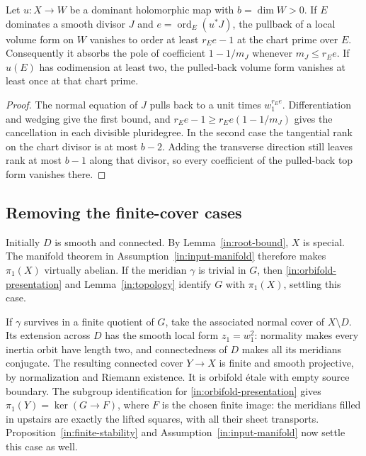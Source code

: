\begin{lemma}\label{in:weighted-vanishing}
Let \(u:X\to W\) be a dominant holomorphic map with
\(b=\dim W>0\).  If \(E\) dominates a smooth divisor \(J\) and
\(e=\operatorname{ord}_E(u^*J)\), the pullback of a local volume
form on \(W\) vanishes to order at least \(r_Ee-1\) at the chart
prime over \(E\).  Consequently it absorbs the pole of coefficient
\(1-1/m_J\) whenever \(m_J\le r_Ee\).  If \(u(E)\) has
codimension at least two, the pulled-back volume form vanishes at
least once at that chart prime.
\end{lemma}

\begin{proof}
The normal equation of \(J\) pulls back to a unit times
\(w_1^{r_Ee}\).  Differentiation and wedging give the first bound,
and
\(r_Ee-1\ge r_Ee(1-1/m_J)\) gives the cancellation in each
divisible pluridegree.  In the second case the tangential rank on
the chart divisor is at most \(b-2\).  Adding the transverse
direction still leaves rank at most \(b-1\) along that divisor,
so every coefficient of the pulled-back top form vanishes there.
\end{proof}

\subsection{Removing the finite-cover cases}
\label{in:finite-cover-cases}
Initially \(D\) is smooth and connected.  By
Lemma~\ref{in:root-bound}, \(X\) is special.  The manifold theorem
in Assumption~\ref{in:input-manifold} therefore makes
\(\pi_1(X)\) virtually abelian.  If the meridian \(\gamma\) is
trivial in \(G\), then \eqref{in:orbifold-presentation} and
Lemma~\ref{in:topology} identify \(G\) with \(\pi_1(X)\), settling
this case.

If \(\gamma\) survives in a finite quotient of \(G\), take the
associated normal cover of \(X\setminus D\).  Its extension across
\(D\) has the smooth local form \(z_1=w_1^2\): normality makes
every inertia orbit have length two, and connectedness of \(D\)
makes all its meridians conjugate.  The resulting connected cover
\(Y\to X\) is finite and smooth projective, by normalization and
Riemann existence.  It is orbifold \'{e}tale with empty source
boundary.  The subgroup identification for
\eqref{in:orbifold-presentation} gives
\(\pi_1(Y)=\ker(G\to F)\), where \(F\) is the chosen finite image:
the meridians filled in upstairs are exactly the lifted squares,
with all their sheet transports.  Proposition~\ref{in:finite-stability}
and Assumption~\ref{in:input-manifold} now settle this case as well.

